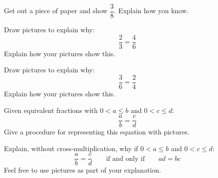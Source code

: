 
\begin{prob}
Get out a piece of paper and show $\dfrac{3}{8}$.  Explain how you know.  
\end{prob}

\begin{prob} 
Draw pictures to explain why:
\[
\frac{2}{3} = \frac{4}{6}
\]
Explain how your pictures show this.
\end{prob}


\begin{prob} 
Draw pictures to explain why:
\[
\frac{3}{6} = \frac{2}{4}
\]
Explain how your pictures show this.
\end{prob}



\begin{prob} 
Given equivalent fractions with $0< a\le b$ and $0 < c\le d$:
\[
\frac{a}{b} = \frac{c}{d}
\]
Give a procedure for representing this equation with pictures.
\end{prob}


\begin{prob} 
Explain, without cross-multiplication, why if $0< a\le b$ and $0 < c\le d$:
\[
\frac{a}{b} = \frac{c}{d}\qquad \text{if and only if}\qquad ad = bc
\]
Feel free to use pictures as part of your explanation.
\end{prob}

